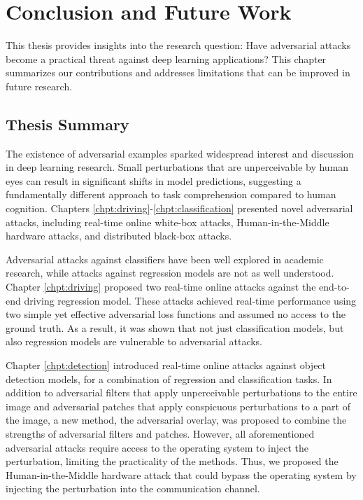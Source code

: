 \chapter{Conclusion and Future Work}
\label{chpt:conclusion}

This thesis provides insights into the research question: Have adversarial attacks become a practical threat against deep learning applications? This chapter summarizes our contributions and addresses limitations that can be improved in future research.

\section{Thesis Summary}

The existence of adversarial examples sparked widespread interest and discussion in deep learning research. Small perturbations that are unperceivable by human eyes can result in significant shifts in model predictions, suggesting a fundamentally different approach to task comprehension compared to human cognition. Chapters \ref{chpt:driving}-\ref{chpt:classification} presented novel adversarial attacks, including real-time online white-box attacks, Human-in-the-Middle hardware attacks, and distributed black-box attacks. 


Adversarial attacks against classifiers have been well explored in academic research, while attacks against regression models are not as well understood. Chapter \ref{chpt:driving} proposed two real-time online attacks against the end-to-end driving regression model. These attacks achieved real-time performance using two simple yet effective adversarial loss functions and assumed no access to the ground truth. As a result, it was shown that not just classification models, but also regression models are vulnerable to adversarial attacks.

Chapter \ref{chpt:detection} introduced real-time online attacks against object detection models, for a combination of regression and classification tasks. In addition to adversarial filters that apply unperceivable perturbations to the entire image and adversarial patches that apply conspicuous perturbations to a part of the image, a new method, the adversarial overlay, was proposed to combine the strengths of adversarial filters and patches. However, all aforementioned adversarial attacks require access to the operating system to inject the perturbation, limiting the practicality of the methods. Thus, we proposed the Human-in-the-Middle hardware attack that could bypass the operating system by injecting the perturbation into the communication channel.

